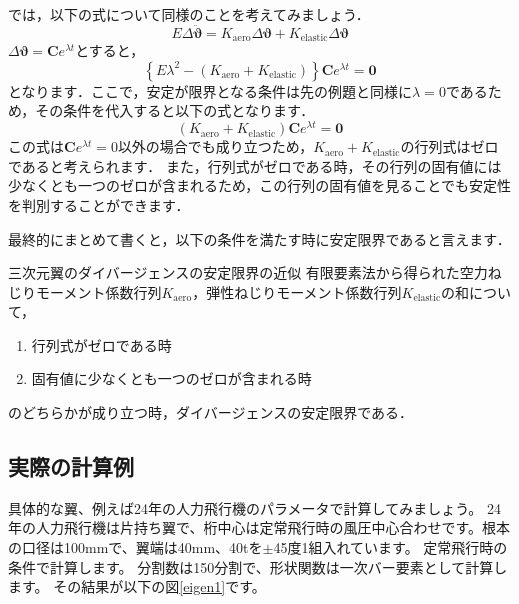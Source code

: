 \documentclass{jarticle}
\begin{document}
では，以下の式について同様のことを考えてみましょう．
\begin{equation}
    E\Delta\ddot{\bm{\vartheta}} = K_\mathrm{aero} \Delta\bm{\vartheta} + K_\mathrm{elastic} \Delta\bm{\vartheta}
\end{equation}
$\Delta\bm{\vartheta} = \bm{C}e^{\lambda t}$とすると，
\begin{equation}
    \left\{ E\lambda^2 - (K_\mathrm{aero} + K_\mathrm{elastic}) \right\}\bm{C}e^{\lambda t} = \bm{0}
\end{equation}
となります．ここで，安定が限界となる条件は先の例題と同様に$\lambda = 0$であるため，その条件を代入すると以下の式となります．
\begin{equation}
    (K_\mathrm{aero} + K_\mathrm{elastic})\bm{C}e^{\lambda t} = \bm{0}
\end{equation}
この式は$\bm{C}e^{\lambda t}=0$以外の場合でも成り立つため，$K_\mathrm{aero} + K_\mathrm{elastic}$の行列式はゼロであると考えられます．
また，行列式がゼロである時，その行列の固有値には少なくとも一つのゼロが含まれるため，この行列の固有値を見ることでも安定性を判別することができます．

最終的にまとめて書くと，以下の条件を満たす時に安定限界であると言えます．
\begin{itembox}[l]{三次元翼のダイバージェンスの安定限界の近似}
    有限要素法から得られた空力ねじりモーメント係数行列$K_\mathrm{aero}$，弾性ねじりモーメント係数行列$K_\mathrm{elastic}$の和について，
    \begin{enumerate}
        \item 行列式がゼロである時
        \item 固有値に少なくとも一つのゼロが含まれる時
    \end{enumerate}
    のどちらかが成り立つ時，ダイバージェンスの安定限界である．
\end{itembox}


\subsection{実際の計算例}

具体的な翼、例えば24年の人力飛行機のパラメータで計算してみましょう。
24年の人力飛行機は片持ち翼で、桁中心は定常飛行時の風圧中心合わせです。根本の口径は100mmで、翼端は40mm、40tを$\pm$45度1組入れています。
定常飛行時の条件で計算します。
分割数は150分割で、形状関数は一次バー要素として計算します。
その結果が以下の図\ref{eigen1}です。
\end{document}
